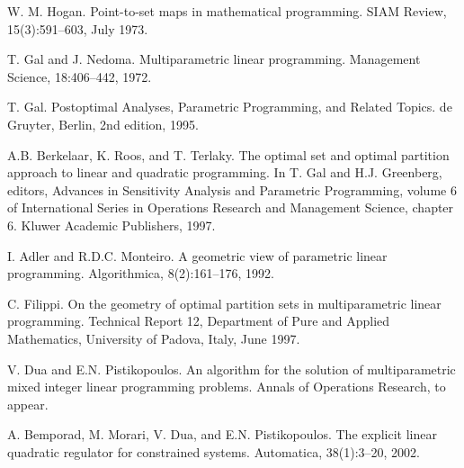 \begin{biblio}

    W. M. Hogan. Point-to-set maps in mathematical programming. SIAM Review, 15(3):591–603, July 1973.
    
    T. Gal and J. Nedoma. Multiparametric linear programming. Management Science, 18:406–442, 1972.
    
    T. Gal. Postoptimal Analyses, Parametric Programming, and Related Topics. de Gruyter, Berlin, 2nd edition, 1995.
    
    A.B. Berkelaar, K. Roos, and T. Terlaky. The optimal set and optimal partition approach to linear and quadratic programming. In T. Gal and H.J. Greenberg, editors, Advances in Sensitivity Analysis and Parametric Programming, volume 6 of International Series in Operations Research and Management Science, chapter 6. Kluwer Academic Publishers, 1997.
    
    I. Adler and R.D.C. Monteiro. A geometric view of parametric linear programming. Algorithmica, 8(2):161–176, 1992.
    
    C. Filippi. On the geometry of optimal partition sets in multiparametric linear programming. Technical Report 12, Department of Pure and Applied Mathematics, University of Padova, Italy, June 1997.
    
    V. Dua and E.N. Pistikopoulos. An algorithm for the solution of multiparametric mixed integer linear programming problems. Annals of Operations Research, to appear.
    
    A. Bemporad, M. Morari, V. Dua, and E.N. Pistikopoulos. The explicit linear quadratic regulator for constrained systems. Automatica, 38(1):3–20, 2002.
    
    \end{biblio} 